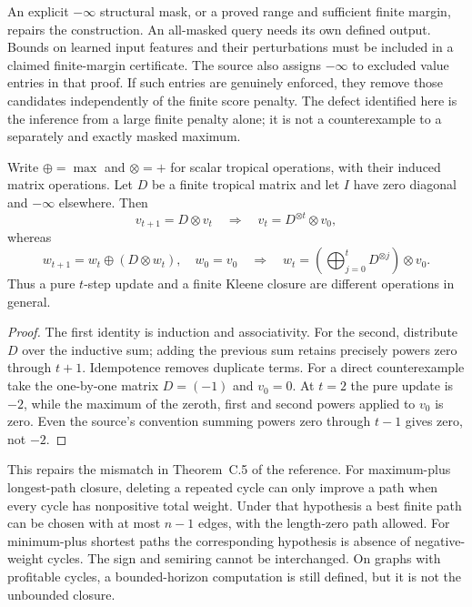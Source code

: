 An explicit $-\infty$ structural mask, or a proved range and sufficient
finite margin, repairs the construction. An all-masked query needs its own
defined output. Bounds on learned input features and their perturbations
must be included in a claimed finite-margin certificate.
The source also assigns $-\infty$ to excluded value entries in that proof.
If such entries are genuinely enforced, they remove those candidates
independently of the finite score penalty. The defect identified here is
the inference from a large finite penalty alone; it is not a counterexample
to a separately and exactly masked maximum.

\begin{proposition}
\label{prop:tropical-horizon-repair}
Write $\oplus=\max$ and $\otimes=+$ for scalar tropical operations, with
their induced matrix operations. Let $D$ be a finite tropical matrix and
let $I$ have zero diagonal and $-\infty$ elsewhere. Then
\[
 v_{t+1}=D\otimes v_t\quad\Longrightarrow\quad
 v_t=D^{\otimes t}\otimes v_0,
\]
whereas
\[
 w_{t+1}=w_t\oplus(D\otimes w_t),\quad w_0=v_0
 \quad\Longrightarrow\quad
 w_t=\left(\bigoplus_{j=0}^{t}D^{\otimes j}\right)\otimes v_0.
\]
Thus a pure $t$-step update and a finite Kleene closure are different
operations in general.
\end{proposition}
\begin{proof}
The first identity is induction and associativity. For the second,
distribute $D$ over the inductive sum; adding the previous sum retains
precisely powers zero through $t+1$. Idempotence removes duplicate terms.
For a direct counterexample take the one-by-one matrix $D=(-1)$ and
$v_0=0$. At $t=2$ the pure update is $-2$, while the maximum of the
zeroth, first and second powers applied to $v_0$ is zero. Even the source's
convention summing powers zero through $t-1$ gives zero, not $-2$.
\end{proof}

This repairs the mismatch in Theorem~C.5 of the reference. For maximum-plus
longest-path closure, deleting a repeated cycle can only improve a path
when every cycle has nonpositive total weight. Under that hypothesis a
best finite path can be chosen with at most $n-1$ edges, with the length-zero
path allowed. For minimum-plus shortest paths the corresponding hypothesis
is absence of negative-weight cycles. The sign and semiring cannot be
interchanged. On graphs with profitable cycles, a bounded-horizon
computation is still defined, but it is not the unbounded closure.

